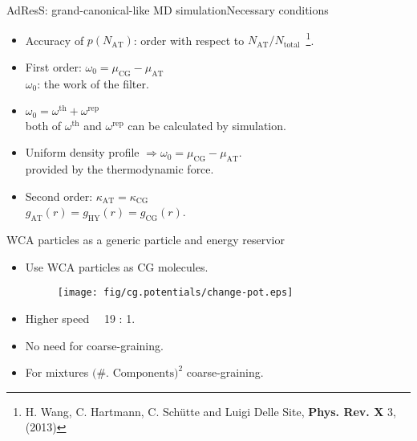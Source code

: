 \documentclass[]{beamer}
\newcommand{\redc}[1]{{\color{red} #1}}
\newcommand{\bluec}[1]{{\color{blue} #1}}
\newcommand{\AT}{{\textrm{{AT}}}}
\newcommand{\CG}{{\textrm{CG}}}
\newcommand{\HY}{{\textrm{HY}}}
\newcommand{\thf}{{\textrm{th}}}
\newcommand{\rep}{{\textrm{rep}}}
\begin{document}
\begin{frame}{AdResS: grand-canonical-like MD simulation}{Necessary conditions}
  \begin{itemize}
    \vfill
  \item<1-> Accuracy of \bluec{$p(N_\AT) $}: order with respect to
    \bluec{$N_\AT / N_{\textrm{total}}$}~\footnote{H. Wang, C. Hartmann, C. Sch\"utte and Luigi Delle Site, \textbf{Phys. Rev. X} 3, (2013)}.
    \vfill
  \item<2-> \bluec{First order}: \redc{$ \omega_0 = \mu_{\CG} - \mu_{\AT}$}\\
    $\omega_0$: the work of the filter.
    \vfill
  \item<3-> \redc{$ \omega_0 = \omega^\thf + \omega^\rep$}\\
    both of $\omega^\thf$ and $\omega^\rep$ can be calculated by simulation.
    \vfill
  \item<4-> Uniform density profile $\Rightarrow \omega_0 = \mu_{\CG} - \mu_{\AT}$.\\
    provided by the \redc{thermodynamic force}.
    \vfill
  \item<5-> \bluec{Second order}: \redc{$\kappa_\AT = \kappa_{\CG}$}\\
    $g_\AT (r) = g_\HY(r) = g_\CG(r)$.
    \vfill
  \end{itemize}  
\end{frame}


\begin{frame}{WCA particles as a generic particle and energy reservior}
  \begin{itemize}
    \vfill
  \item<1-> Use WCA particles as CG molecules.
    \begin{figure}
      \centering 
      \texttt{[image: fig/cg.potentials/change-pot.eps]}
    \end{figure}   
  \item<2-> Higher speed\ \ \Large{\redc{19} : \bluec{1}}.
    \vfill
  \item<3-> No need for coarse-graining.
    \vfill
  \item<4-> For mixtures $\textrm{(\#. Components)}^2$ coarse-graining.
    \vfill
  \end{itemize}
\end{frame}
\end{document}
